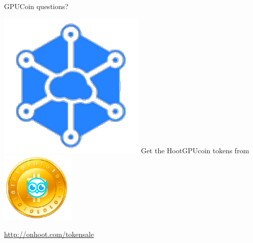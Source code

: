 \documentclass[10pt,handout]{beamer}
\begin{document}
\begin{frame}[standout]{GPUCoin questions?}

\includegraphics[scale=.5]{static/ipcn-p2p}
Get the HootGPUcoin tokens from
\includegraphics[scale=0.5]{static/hootcoin} 
 \begin{center}\url{http://onhoot.com/tokensale}\end{center}


 \begin{center}\ccbysa\end{center}

\end{frame}



 
 



% 	
\end{document}

